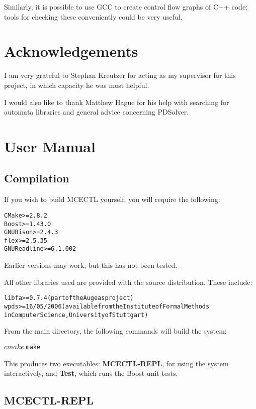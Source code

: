 \documentclass[11pt]{article}
\theoremstyle{definition}
\begin{document}
Similarly, it is possible to use GCC to create control flow graphs of C++ code;
tools for checking these conveniently could be very useful.

\section{Acknowledgements}

I am very grateful to Stephan Kreutzer for acting as my supervisor for this
project, in which capacity he was most helpful.

I would also like to thank Matthew Hague for his help with searching for
automata libraries and general advice concerning PDSolver.

{}

%

\appendix
\section{User Manual}

\subsection{Compilation}

If you wish to build MCECTL yourself, you will require the following:
\begin{alltt}
CMake >= 2.8.2
Boost >= 1.43.0
GNU Bison >= 2.4.3
flex >= 2.5.35
GNU Readline >= 6.1.002
\end{alltt}

Earlier versions may work, but this has not been tested.

All other libraries used are provided with the source distribution. These include:
\begin{alltt}
libfa >= 0.7.4 (part of the Augeas project)
wpds >= 16/05/2006 (available from the Institute of Formal Methods 
in Computer Science, University of Stuttgart)
\end{alltt}

From the main directory, the following commands will build the system:
\begin{alltt}
$ cmake .
$ make
\end{alltt}

This produces two executables: \textbf{MCECTL-REPL}, for using the system
interactively, and \textbf{Test}, which runs the Boost unit tests. 

\subsection{MCECTL-REPL}
\end{document}
